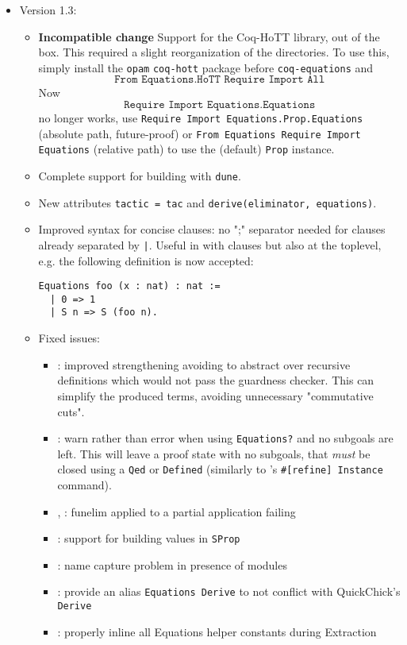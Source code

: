 \begin{itemize}
\item Version 1.3: 
  \begin{itemize}
  \item \textbf{Incompatible change} Support for the Coq-HoTT library, out of the box. This required a slight reorganization 
    of the directories. To use this, simply install the \texttt{opam} \texttt{coq-hott} package before 
    \texttt{coq-equations} and \[\texttt{From Equations.HoTT Require Import All}\]
    Now \[\texttt{Require Import Equations.Equations}\] no longer works, 
    use \texttt{Require Import Equations.Prop.Equations} (absolute path, future-proof) or 
    \texttt{From Equations Require Import Equations} (relative path) to use the 
    (default) \texttt{Prop} instance.

  \item Complete support for building with \texttt{dune}.

  \item New attributes \texttt{tactic = tac} and \texttt{derive(eliminator, equations)}.
  \item Improved syntax for concise clauses: no ";" separator needed for clauses 
    already separated by \texttt{|}. Useful in with clauses but also at the toplevel, e.g.
    the following definition is now accepted:
\begin{verbatim} 
Equations foo (x : nat) : nat :=
  | 0 => 1
  | S n => S (foo n).
\end{verbatim}
  \item Fixed issues:
    \begin{itemize}
    \item {}: improved strengthening avoiding to abstract over recursive definitions
      which would not pass the guardness checker. This can simplify the produced terms, avoiding 
      unnecessary "commutative cuts".
    \item {}: warn rather than error when using \texttt{Equations?} and no subgoals are left.
      This will leave a proof state with no subgoals, that \emph{must} be closed using a \texttt{Qed} 
      or \texttt{Defined} (similarly to \Coq's \texttt{\#[refine] Instance} command).
    \item {}, : funelim applied to a partial application failing
    \item {}: support for building values in \texttt{SProp}
    \item {}: name capture problem in presence of modules
    \item {}: provide an alias \texttt{Equations Derive} to not conflict with QuickChick's \texttt{Derive}
    \item {}: properly inline all Equations helper constants during Extraction
\end{itemize}
\end{itemize}


\end{itemize}
